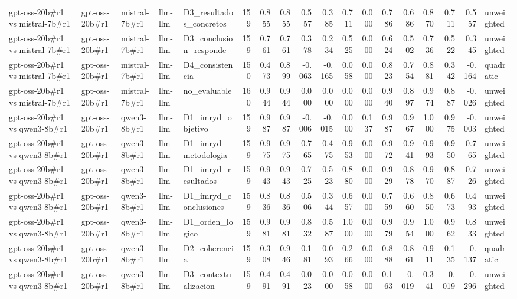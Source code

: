\begin{table}
{\begin{tabular}{lllllrrrrrrrrrrrrl}
gpt-oss-20b\#r1 vs mistral-7b\#r1 & gpt-oss-20b\#r1 & mistral-7b\#r1 & llm-llm & D3\_resultados\_concretos & 159 & 0.855 & 0.855 & 0.557 & 0.385 & 0.711 & 0.000 & 0.786 & 0.686 & 0.870 & 0.711 & 0.557 & unweighted \\
gpt-oss-20b\#r1 vs mistral-7b\#r1 & gpt-oss-20b\#r1 & mistral-7b\#r1 & llm-llm & D3\_conclusion\_responde & 159 & 0.761 & 0.761 & 0.378 & 0.234 & 0.525 & 0.000 & 0.624 & 0.502 & 0.736 & 0.522 & 0.345 & unweighted \\
gpt-oss-20b\#r1 vs mistral-7b\#r1 & gpt-oss-20b\#r1 & mistral-7b\#r1 & llm-llm & D4\_consistencia & 150 & 0.473 & 0.899 & -0.063 & -0.165 & 0.058 & 0.000 & 0.823 & 0.754 & 0.881 & 0.342 & -0.164 & quadratic \\
gpt-oss-20b\#r1 vs mistral-7b\#r1 & gpt-oss-20b\#r1 & mistral-7b\#r1 & llm-llm & no\_evaluable & 160 & 0.944 & 0.944 & 0.000 & 0.000 & 0.000 & 0.000 & 0.940 & 0.897 & 0.974 & 0.887 & -0.026 & unweighted \\
gpt-oss-20b\#r1 vs qwen3-8b\#r1 & gpt-oss-20b\#r1 & qwen3-8b\#r1 & llm-llm & D1\_imryd\_objetivo & 159 & 0.987 & 0.987 & -0.006 & -0.015 & 0.000 & 0.137 & 0.987 & 0.967 & 1.000 & 0.975 & -0.003 & unweighted \\
gpt-oss-20b\#r1 vs qwen3-8b\#r1 & gpt-oss-20b\#r1 & qwen3-8b\#r1 & llm-llm & D1\_imryd\_metodologia & 159 & 0.975 & 0.975 & 0.765 & 0.475 & 0.953 & 0.000 & 0.972 & 0.941 & 0.993 & 0.950 & 0.765 & unweighted \\
gpt-oss-20b\#r1 vs qwen3-8b\#r1 & gpt-oss-20b\#r1 & qwen3-8b\#r1 & llm-llm & D1\_imryd\_resultados & 159 & 0.943 & 0.943 & 0.725 & 0.523 & 0.880 & 0.000 & 0.929 & 0.878 & 0.970 & 0.887 & 0.726 & unweighted \\
gpt-oss-20b\#r1 vs qwen3-8b\#r1 & gpt-oss-20b\#r1 & qwen3-8b\#r1 & llm-llm & D1\_imryd\_conclusiones & 159 & 0.836 & 0.836 & 0.506 & 0.344 & 0.657 & 0.000 & 0.759 & 0.660 & 0.850 & 0.673 & 0.493 & unweighted \\
gpt-oss-20b\#r1 vs qwen3-8b\#r1 & gpt-oss-20b\#r1 & qwen3-8b\#r1 & llm-llm & D1\_orden\_logico & 159 & 0.981 & 0.981 & 0.832 & 0.587 & 1.000 & 0.000 & 0.979 & 0.954 & 1.000 & 0.962 & 0.833 & unweighted \\
gpt-oss-20b\#r1 vs qwen3-8b\#r1 & gpt-oss-20b\#r1 & qwen3-8b\#r1 & llm-llm & D2\_coherencia & 159 & 0.308 & 0.946 & 0.181 & 0.093 & 0.266 & 0.000 & 0.888 & 0.861 & 0.911 & 0.135 & -0.137 & quadratic \\
gpt-oss-20b\#r1 vs qwen3-8b\#r1 & gpt-oss-20b\#r1 & qwen3-8b\#r1 & llm-llm & D3\_contextualizacion & 159 & 0.491 & 0.491 & 0.023 & 0.000 & 0.058 & 0.000 & 0.163 & -0.019 & 0.341 & -0.019 & -0.296 & unweighted \\

\end{tabular}}
\end{table}
